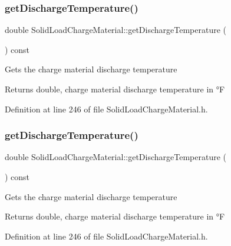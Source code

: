 \subsubsection{\texorpdfstring{get\+Discharge\+Temperature()}{getDischargeTemperature()}\hspace{0.1cm}{\footnotesize\ttfamily [1/3]}}
{\footnotesize\ttfamily double Solid\+Load\+Charge\+Material\+::get\+Discharge\+Temperature (\begin{DoxyParamCaption}{ }\end{DoxyParamCaption}) const\hspace{0.3cm}{\ttfamily [inline]}}

Gets the charge material discharge temperature \begin{DoxyReturn}{Returns}
double, charge material discharge temperature in °F 
\end{DoxyReturn}


Definition at line 246 of file Solid\+Load\+Charge\+Material.\+h.

\mbox{\label{class_solid_load_charge_material_afcb8c00c2e23ad1444f34960b19835a0}} 
\subsubsection{\texorpdfstring{get\+Discharge\+Temperature()}{getDischargeTemperature()}\hspace{0.1cm}{\footnotesize\ttfamily [2/3]}}
{\footnotesize\ttfamily double Solid\+Load\+Charge\+Material\+::get\+Discharge\+Temperature (\begin{DoxyParamCaption}{ }\end{DoxyParamCaption}) const\hspace{0.3cm}{\ttfamily [inline]}}

Gets the charge material discharge temperature \begin{DoxyReturn}{Returns}
double, charge material discharge temperature in °F 
\end{DoxyReturn}


Definition at line 246 of file Solid\+Load\+Charge\+Material.\+h.

\mbox{\label{class_solid_load_charge_material_afcb8c00c2e23ad1444f34960b19835a0}} 
